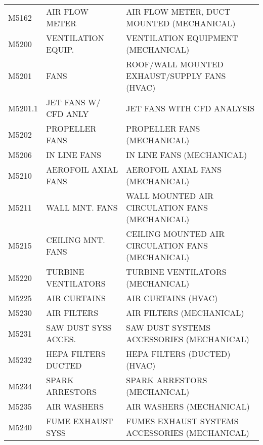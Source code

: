 \begin{longtable}[l]{l%
                  l|%
                  l|}
\rowcolor{thetableheadbgcolor!0.25!white} M5162       & AIR FLOW METER   & AIR FLOW METER, DUCT MOUNTED (MECHANICAL)   \\
\rowcolor{thetableheadbgcolor!0.25!white} M5200       & VENTILATION EQUIP.   & VENTILATION EQUIPMENT (MECHANICAL)   \\
\rowcolor{thetableheadbgcolor!0.25!white} M5201       & FANS   & ROOF/WALL MOUNTED EXHAUST/SUPPLY FANS (HVAC)   \\
\rowcolor{thetableheadbgcolor!0.25!white} M5201.1     & JET FANS W/ CFD ANLY   & JET FANS WITH CFD ANALYSIS   \\
\rowcolor{thetableheadbgcolor!0.25!white} M5202       & PROPELLER FANS   & PROPELLER FANS (MECHANICAL)   \\
\rowcolor{thetableheadbgcolor!0.25!white} M5206       & IN LINE FANS   & IN LINE FANS (MECHANICAL)   \\
\rowcolor{thetableheadbgcolor!0.25!white} M5210       & AEROFOIL AXIAL FANS   & AEROFOIL AXIAL FANS (MECHANICAL)   \\
\rowcolor{thetableheadbgcolor!0.25!white} M5211       & WALL MNT. FANS   & WALL MOUNTED AIR CIRCULATION FANS (MECHANICAL)   \\
\rowcolor{thetableheadbgcolor!0.25!white} M5215       & CEILING MNT. FANS   & CEILING MOUNTED AIR CIRCULATION FANS (MECHANICAL)   \\
\rowcolor{thetableheadbgcolor!0.25!white} M5220       & TURBINE VENTILATORS   & TURBINE VENTILATORS (MECHANICAL)   \\
\rowcolor{thetableheadbgcolor!0.25!white} M5225       & AIR CURTAINS   & AIR CURTAINS (HVAC)   \\
\rowcolor{thetableheadbgcolor!0.25!white} M5230       & AIR FILTERS   & AIR FILTERS (MECHANICAL)   \\
\rowcolor{thetableheadbgcolor!0.25!white} M5231       & SAW DUST SYSS ACCES.   & SAW DUST SYSTEMS ACCESSORIES (MECHANICAL)   \\
\rowcolor{thetableheadbgcolor!0.25!white} M5232       & HEPA FILTERS DUCTED   & HEPA FILTERS (DUCTED) (HVAC)   \\
\rowcolor{thetableheadbgcolor!0.25!white} M5234       & SPARK ARRESTORS   & SPARK ARRESTORS (MECHANICAL)   \\
\rowcolor{thetableheadbgcolor!0.25!white} M5235       & AIR WASHERS   & AIR WASHERS (MECHANICAL)   \\
\rowcolor{thetableheadbgcolor!0.25!white} M5240       & FUME EXHAUST SYSS   & FUMES EXHAUST SYSTEMS ACCESSORIES (MECHANICAL)   \\

\end{longtable}
